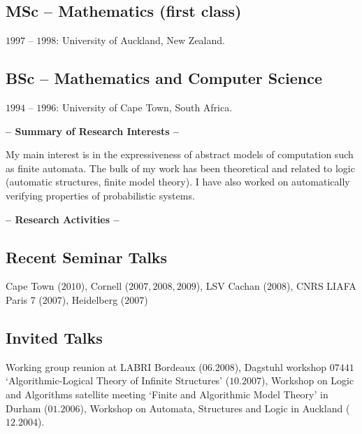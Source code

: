 \documentclass[a4paper]{article}
\def\tit#1{\medskip \begin{center}  {\Large {\bf -- #1 -- }} \end{center}}
\begin{document}
\subsection*{{MSc -- Mathematics (first class)}}
{$1997$ -- $1998$: University of Auckland, New Zealand.}

\subsection*{BSc -- Mathematics and Computer Science}
{$1994$ -- $1996$: University of Cape Town, South Africa.} 

\tit{Summary of Research Interests}

My main interest is in the expressiveness of abstract models of computation such as
finite automata. The bulk of my work has been theoretical and related to logic (automatic structures,
finite model theory). I have also worked on  automatically verifying properties of probabilistic systems.

\tit{Research Activities}

\subsection*{Recent Seminar Talks} Cape Town ($2010$), Cornell ($2007,2008,2009$), LSV Cachan ($2008$), CNRS LIAFA Paris 7 ($2007$), Heidelberg ($2007$)\\

\subsection*{Invited Talks}
Working group reunion at LABRI Bordeaux ($06.2008$), Dagstuhl workshop $07441$ `Algorithmic-Logical Theory of Infinite Structures' ($10.2007$), Workshop on Logic and Algorithms
satellite meeting `Finite and Algorithmic Model Theory' in Durham ($01.2006$), Workshop on Automata, Structures and Logic in Auckland ($12.2004$).
\end{document}
